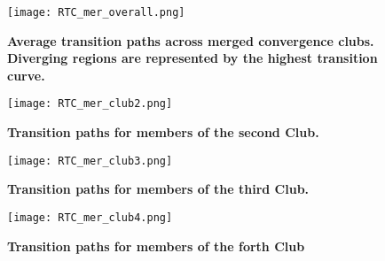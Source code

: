 \documentclass[11pt]{article}
\begin{document}
\begin{figure}%
\centering 
  {\texttt{[image: RTC\_mer\_overall.png]} }
  \caption{\textbf{Average transition paths across merged convergence clubs. Diverging regions are represented by the highest transition curve.}}
  \label{paths_overall}
  \end{figure}



\begin{figure}%
    \centering
    \texttt{[image: RTC\_mer\_club2.png]}
    \caption{\textbf{Transition paths for members of the second Club.}}
    \label{paths2}
\end{figure}


\begin{figure}%
    \centering
    \texttt{[image: RTC\_mer\_club3.png]}
    \caption{\textbf{Transition paths for members of the third Club.}}
    \label{paths3}
\end{figure}

\begin{figure}%
    \centering
    \texttt{[image: RTC\_mer\_club4.png]}
    \caption{\textbf{Transition paths for members of the forth Club}}
    \label{paths4}
\end{figure}



\end{document}
